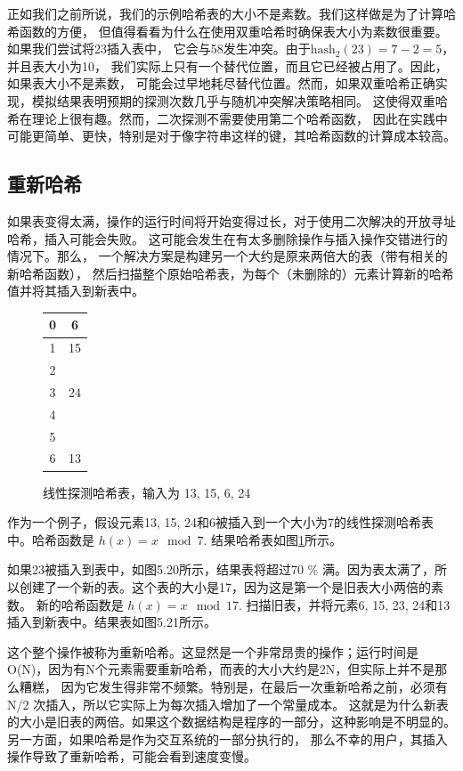 \documentclass[a4paper]{ctexart}
\theoremstyle{definition}
\theoremstyle{definition}
\begin{document}
正如我们之前所说，我们的示例哈希表的大小不是素数。我们这样做是为了计算哈希函数的方便，
但值得看看为什么在使用双重哈希时确保表大小为素数很重要。如果我们尝试将23插入表中，
它会与58发生冲突。由于$\text{hash}_2(23) = 7 - 2 = 5$，并且表大小为10，
我们实际上只有一个替代位置，而且它已经被占用了。因此，如果表大小不是素数，
可能会过早地耗尽替代位置。然而，如果双重哈希正确实现，模拟结果表明预期的探测次数几乎与随机冲突解决策略相同。
这使得双重哈希在理论上很有趣。然而，二次探测不需要使用第二个哈希函数，
因此在实践中可能更简单、更快，特别是对于像字符串这样的键，其哈希函数的计算成本较高。

\subsection{重新哈希}

如果表变得太满，操作的运行时间将开始变得过长，对于使用二次解决的开放寻址哈希，插入可能会失败。
这可能会发生在有太多删除操作与插入操作交错进行的情况下。那么，
一个解决方案是构建另一个大约是原来两倍大的表（带有相关的新哈希函数），
然后扫描整个原始哈希表，为每个（未删除的）元素计算新的哈希值并将其插入到新表中。

\begin{figure}[htbp]
    \centering
    \begin{tabular}{|c|c|}
        \hline
        0 & 6 \\
        \hline
        1 & 15 \\
        \hline
        2 &  \\
        \hline
        3 & 24 \\
        \hline
        4 &  \\
        \hline
        5 &  \\
        \hline
        6 & 13 \\
        \hline
    \end{tabular}
    \caption{线性探测哈希表，输入为 13, 15, 6, 24}
    \label{fig:hash_table_1}
\end{figure}

作为一个例子，假设元素13, 15, 24和6被插入到一个大小为7的线性探测哈希表中。哈希函数是 $h(x) = x \mod 7$. 结果哈希表如图\ref{fig:hash_table_1}所示。

如果23被插入到表中，如图5.20所示，结果表将超过70 \% 满。因为表太满了，所以创建了一个新的表。这个表的大小是17，因为这是第一个是旧表大小两倍的素数。
新的哈希函数是 $h(x) = x \mod 17$. 扫描旧表，并将元素6, 15, 23, 24和13插入到新表中。结果表如图5.21所示。

这个整个操作被称为重新哈希。这显然是一个非常昂贵的操作；运行时间是O(N)，因为有N个元素需要重新哈希，而表的大小大约是2N，但实际上并不是那么糟糕，
因为它发生得非常不频繁。特别是，在最后一次重新哈希之前，必须有 N/2 次插入，所以它实际上为每次插入增加了一个常量成本。
这就是为什么新表的大小是旧表的两倍。如果这个数据结构是程序的一部分，这种影响是不明显的。另一方面，如果哈希是作为交互系统的一部分执行的，
那么不幸的用户，其插入操作导致了重新哈希，可能会看到速度变慢。
\end{document}

